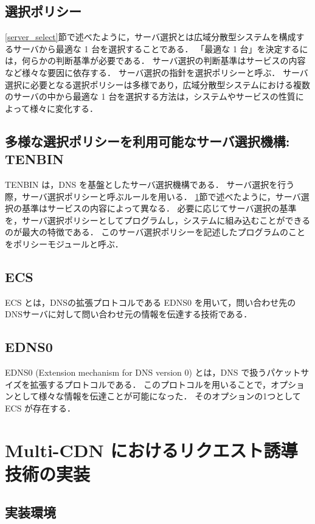 \documentclass[a4j,12pt,onecolumn,oneside,titlepage,openany,final]{jreport}
\begin{document}
\section{選択ポリシー}\label{select_policy}
\ref{server_select}節で述べたように，サーバ選択とは広域分散型システムを構成するサーバから最適な 1 台を選択することである．
「最適な 1 台」を決定するには，何らかの判断基準が必要である．
サーバ選択の判断基準はサービスの内容など様々な要因に依存する．
サーバ選択の指針を選択ポリシーと呼ぶ．
サーバ選択に必要となる選択ポリシーは多様であり，広域分散型システムにおける複数のサーバの中から最適な 1 台を選択する方法は，システムやサービスの性質によって様々に変化する．

\section{多様な選択ポリシーを利用可能なサーバ選択機構: TENBIN}
TENBIN は，DNS を基盤としたサーバ選択機構である．
サーバ選択を行う際，サーバ選択ポリシーと呼ぶルールを用いる．
\ref{select_policy}節で述べたように，サーバ選択の基準はサービスの内容によって異なる．
必要に応じてサーバ選択の基準を，サーバ選択ポリシーとしてプログラムし，システムに組み込むことができるのが最大の特徴である．
このサーバ選択ポリシーを記述したプログラムのことをポリシーモジュールと呼ぶ．

\section{ECS}
ECS とは，DNSの拡張プロトコルである EDNS0\cite{edns0} を用いて，問い合わせ先のDNSサーバに対して問い合わせ元の情報を伝達する技術である．

\section{EDNS0}
EDNS0 (Extension mechanism for DNS version 0) とは，DNS で扱うパケットサイズを拡張するプロトコルである．
このプロトコルを用いることで，オプションとして様々な情報を伝達ことが可能になった．
そのオプションの1つとして ECS が存在する．

\chapter{Multi-CDN におけるリクエスト誘導技術の実装}\label{chap:Implement}

\section{実装環境}
\end{document}
